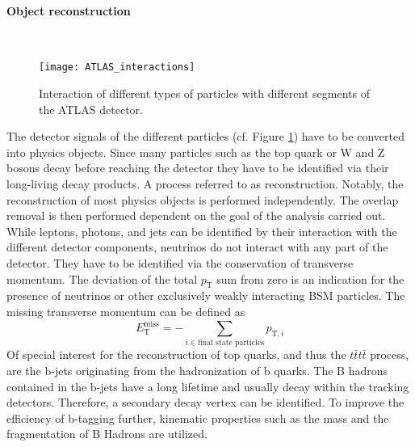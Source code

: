 \paragraph{Object reconstruction} \mbox{} \\

\begin{figure}[H]
\centering
\texttt{[image: ATLAS\_interactions]}
\caption{Interaction of different types of particles with different segments of the ATLAS detector.\cite{ATLASint}}
\label{fig:Interaction}
\end{figure}

The detector signals of the different particles (cf. Figure \ref{fig:Interaction}) have to be converted into physics objects. Since many particles such as the top quark or W and Z bosons decay before reaching the detector they have to be identified via their long-living decay products. A process referred to as reconstruction. Notably, the reconstruction of most physics objects is performed independently. The overlap removal is then performed dependent on the goal of the analysis carried out. \\
While leptons, photons, and jets can be identified by their interaction with the different detector components, neutrinos do not interact with any part of the detector. They have to be identified via the conservation of transverse momentum. The deviation of the total $p_{\text{T}}$ sum from zero is an indication for the presence of neutrinos or other exclusively weakly interacting BSM particles. The missing transverse momentum can be defined as
\begin{equation}
\label{eq:Etmis} 
E_{\text{T}}^{\text{miss}} = - \sum_{i \in {\text{final state particles}}} p_{\text{T},i}
\end{equation}
Of special interest for the reconstruction of top quarks, and thus the $t\bar{t}t\bar{t}$ process, are the b-jets originating from the hadronization of b quarks. The B hadrons contained in the b-jets have a long lifetime and usually decay within the tracking detectors. Therefore, a secondary decay vertex can be identified. To improve the efficiency of b-tagging further, kinematic properties such as the mass and the fragmentation of B Hadrons are utilized. 
